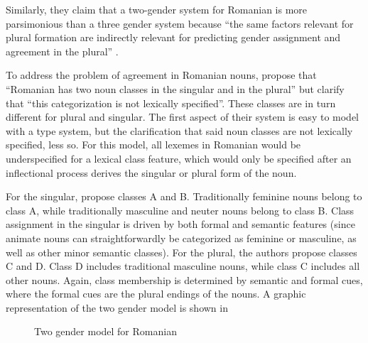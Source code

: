 Similarly, they claim that a two-gender system for Romanian is more parsimonious than a three gender system because ``the same factors relevant for plural formation are indirectly relevant for predicting gender assignment and agreement in the plural'' \autocite[45]{Bateman.2010}.

To address the problem of agreement in Romanian nouns, \textcite[52]{Bateman.2010} propose that ``Romanian has two noun classes in the singular and in the plural'' but clarify that ``this categorization is not lexically specified''. These classes are in turn different for plural and singular. The first aspect of their system is easy to model with a type system, but the clarification that said noun classes are not lexically specified, less so. For this model, all lexemes in Romanian would be underspecified for a lexical class feature, which would only be specified after an inflectional process derives the singular or plural form of the noun.

For the singular, \textcite{Bateman.2010} propose classes A and B. Traditionally feminine nouns belong to class A, while traditionally masculine and neuter nouns belong to class B. Class assignment in the singular is driven by both formal and semantic features (since animate nouns can straightforwardly be categorized as feminine or masculine, as well as other minor semantic classes). For the plural, the authors propose classes C and D. Class D includes traditional masculine nouns, while class C includes all other nouns. Again, class membership is determined by semantic and formal cues, where the formal cues are the plural endings of the nouns. A graphic representation of the two gender model is shown in 

\begin{figure}
    \caption{Two gender model for Romanian} \label{fig:graphic-two-gender-bateman}
\end{figure}

